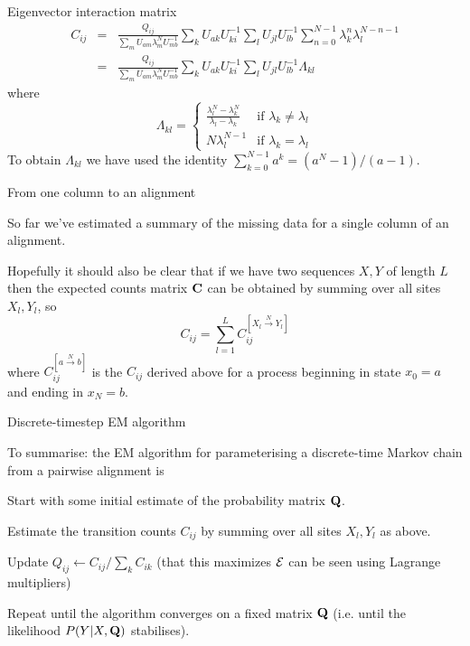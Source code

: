 \documentclass{beamer}
\begin{document}
\begin{frame}{Eigenvector interaction matrix}
\begin{eqnarray*}
C_{ij} & = & \frac{Q_{ij}}{\sum_m U_{am} \lambda^N_m U^{-1}_{mb}}
\sum_k U_{ak} U^{-1}_{ki} \sum_l U_{jl} U^{-1}_{lb}
\sum_{n=0}^{N-1} \lambda_k^n \lambda_l^{N-n-1}  \\
& = & \frac{Q_{ij}}{\sum_m U_{am} \lambda^N_m U^{-1}_{mb}}
\sum_k U_{ak} U^{-1}_{ki} \sum_l U_{jl} U^{-1}_{lb} \Lambda_{kl}
\end{eqnarray*}
where
\[
\Lambda_{kl} = \left\{ \begin{array}{ll}
\displaystyle
\frac{\lambda_l^N - \lambda_k^N}{\lambda_l - \lambda_k} & \mbox{if $\lambda_k \neq \lambda_l$} \\
N \lambda_l^{N-1} & \mbox{if $\lambda_k = \lambda_l$}
\end{array} \right.
\]
To obtain $\Lambda_{kl}$ we have used the identity $\sum_{k=0}^{N-1} a^k = (a^N - 1)/(a-1)$.
\end{frame}

\begin{frame}{From one column to an alignment}

So far we've estimated a summary of the missing data for a single column of an alignment.

Hopefully it should also be clear that if we have two sequences $X,Y$ of length $L$ then the expected counts matrix ${\bf C}$
can be obtained by summing over all sites $X_l,Y_l$, so
\[
C_{ij} = \sum_{l=1}^L C_{ij}^{[X_l \stackrel{N}{\to} Y_l]}
\]
where $C_{ij}^{[a \stackrel{N}{\to} b]}$ is the $C_{ij}$ derived above for a process beginning in state $x_0=a$ and ending in $x_N=b$.
\end{frame}

\begin{frame}{Discrete-timestep EM algorithm}
 \itemb
 \item To summarise: the EM algorithm for parameterising a discrete-time Markov chain from a pairwise alignment is
  \enumb
  \item Start with some initial estimate of the probability matrix ${\bf Q}$.
  \item Estimate the transition counts $C_{ij}$ by summing over all sites $X_l,Y_l$ as above.
  \item Update $Q_{ij} \leftarrow C_{ij} / \sum_k C_{ik}$ (that this maximizes ${\cal E}$ can be seen using Lagrange multipliers)
  \item Repeat until the algorithm converges on a fixed matrix ${\bf Q}$ (i.e. until the likelihood $P(Y|X,{\bf Q})$ stabilises).
  \enume
\iteme
\end{frame}
\end{document}
